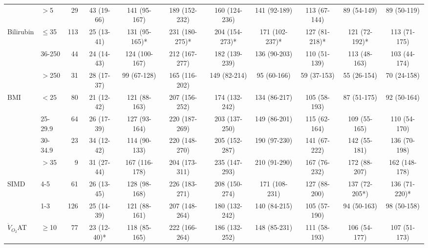 \begin{sidewaystable}[p]
\begin{tabular}{|llr | cccccccc|}
		                    & $>$5     &  29 & 43 (19-66)  & 141 (95-167)  & 189 (152-232)  & 160 (124-236)  &  141 (92-189)  & 113 (67-144)  &  89 (54-149)  &  89 (50-119)  \\
		Bilirubin           & $\leq$35 & 113 & 25 (13-41)  & 131 (95-165)* & 231 (180-275)* & 204 (154-273)* & 171 (102-237)* & 127 (81-218)* & 121 (72-192)* & 113 (71-175)  \\
		                    & 36-250   &  44 & 24 (14-43)  & 124 (100-167) & 212 (167-277)  & 182 (139-239)  &  136 (90-203)  & 110 (51-139)  & 113 (48-163)  & 103 (44-174)  \\
		                    & $>$250   &  31 & 28 (17-37)  &  99 (67-128)  & 165 (116-202)  &  149 (82-214)  &  95 (60-166)   &  59 (37-153)  &  55 (26-154)  &  70 (24-158)  \\
		BMI                 & $<25$    &  80 & 21 (12-42)  & 121 (88-163)  & 207 (156-252)  & 174 (132-242)  &  134 (86-217)  & 105 (58-193)  &  87 (51-175)  &  92 (50-164)  \\
		                    & 25-29.9  &  64 & 26 (17-39)  & 127 (93-164)  & 220 (187-269)  & 203 (137-250)  &  149 (86-201)  & 115 (62-164)  & 109 (55-165)  & 110 (54-170)  \\
		                    & 30-34.9  &  23 & 34 (12-42)  & 114 (90-133)  & 220 (148-270)  & 205 (152-287)  &  190 (97-230)  & 141 (67-222)  & 142 (55-181)  & 136 (70-198)  \\
		                    & $>$35    &   9 & 31 (27-44)  & 167 (116-178) & 204 (173-311)  & 235 (147-293)  &  210 (91-290)  & 167 (76-232)  & 172 (88-207)  & 162 (148-178) \\
		SIMD                & 4-5      &  61 & 26 (13-45)  & 128 (98-168)  & 226 (183-271)  & 208 (150-274)  & 171 (108-231)  & 127 (88-200)  & 137 (72-205*) & 136 (71-220)* \\
		                    & 1-3      & 126 & 25 (14-39)  & 121 (88-161)  & 207 (148-264)  & 180 (132-242)  &  140 (84-215)  & 105 (57-190)  &  94 (50-163)  &  98 (50-158)  \\
		$\dot{V}_{O_2}$AT   & $\geq$10 &  77 & 23 (12-40)* & 118 (85-165)  & 222 (166-264)  & 186 (132-252)  &  148 (85-231)  & 111 (58-193)  & 106 (54-177)  & 107 (51-173)  \\

\end{tabular}
\end{sidewaystable}
